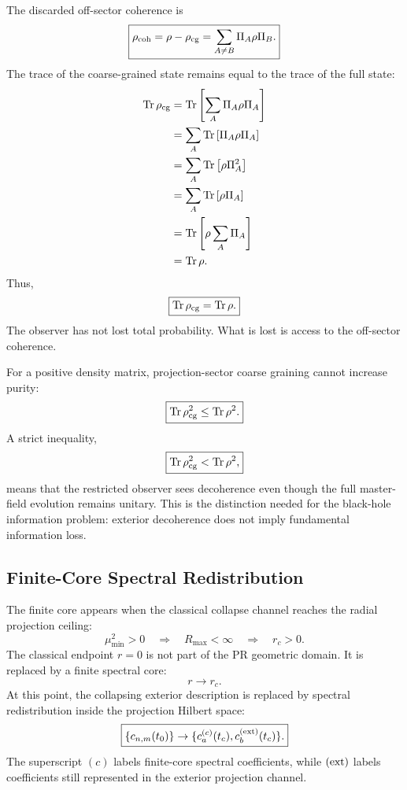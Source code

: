 \documentclass[11pt]{article}
\begin{document}
The discarded off-sector coherence is
\begin{equation}
\boxed{
\rho_{\rm coh}
=
\rho-\rho_{\rm cg}
=
\sum_{A\neq B}
\Pi_A\rho\Pi_B.
}
\end{equation}
The trace of the coarse-grained state remains equal to the trace of the full
state:
\begin{align}
{\rm Tr}\,\rho_{\rm cg}
&=
{\rm Tr}
\left[
\sum_A
\Pi_A\rho\Pi_A
\right]
\\
&=
\sum_A
{\rm Tr}
\left[
\Pi_A\rho\Pi_A
\right]
\\
&=
\sum_A
{\rm Tr}
\left[
\rho\Pi_A^2
\right]
\\
&=
\sum_A
{\rm Tr}
\left[
\rho\Pi_A
\right]
\\
&=
{\rm Tr}
\left[
\rho
\sum_A\Pi_A
\right]
\\
&=
{\rm Tr}\,\rho.
\end{align}
Thus,
\begin{equation}
\boxed{
{\rm Tr}\,\rho_{\rm cg}
=
{\rm Tr}\,\rho.
}
\end{equation}
The observer has not lost total probability. What is lost is access to the
off-sector coherence.

For a positive density matrix, projection-sector coarse graining cannot increase
purity:
\begin{equation}
\boxed{
{\rm Tr}\,\rho_{\rm cg}^2
\leq
{\rm Tr}\,\rho^2.
}
\end{equation}
A strict inequality,
\begin{equation}
\boxed{
{\rm Tr}\,\rho_{\rm cg}^2
<
{\rm Tr}\,\rho^2,
}
\end{equation}
means that the restricted observer sees decoherence even though the full
master-field evolution remains unitary. This is the distinction needed for the
black-hole information problem: exterior decoherence does not imply fundamental
information loss.

\subsection{Finite-Core Spectral Redistribution}

The finite core appears when the classical collapse channel reaches the radial
projection ceiling:
\begin{equation}
\boxed{
\mu_{\min}^2>0
\quad\Longrightarrow\quad
R_{\max}<\infty
\quad\Longrightarrow\quad
r_c>0.
}
\end{equation}
The classical endpoint \(r=0\) is not part of the PR geometric domain. It is
replaced by a finite spectral core:
\begin{equation}
\boxed{
r\rightarrow r_c.
}
\end{equation}
At this point, the collapsing exterior description is replaced by spectral
redistribution inside the projection Hilbert space:
\begin{equation}
\boxed{
\{c_{n,m}(t_0)\}
\rightarrow
\{c_{a}^{(c)}(t_c),c_{b}^{({\rm ext})}(t_c)\}.
}
\end{equation}
The superscript \((c)\) labels finite-core spectral coefficients, while
\(({\rm ext})\) labels coefficients still represented in the exterior
projection channel.
\end{document}
